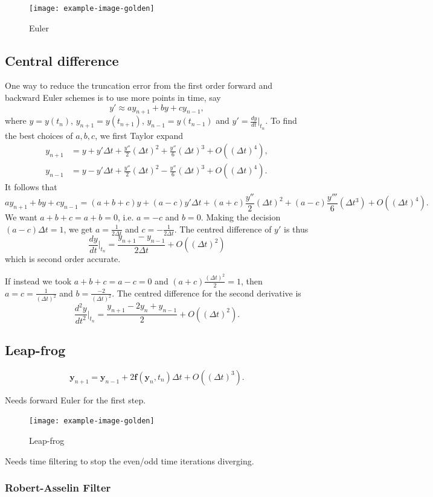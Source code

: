 \documentclass[11pt, a4paper]{article}
\theoremstyle{break}
\newcommand{\ve}{\mathbf} %
\newcommand{\dt}{\Delta t}
\newcommand{\dder}[2]{\frac{d #1}{d #2}}
\newcommand{\ddder}[3][2]{\frac{d^#1 #2}{d #3^#1}}
\newcommand{\eval}[1]{\big\rvert_{#1}}
\newcommand{\Eval}[1]{\bigg\rvert_{#1}}
\begin{document}
\begin{figure}\centering
	\texttt{[image: example-image-golden]}
	\caption{Euler}\label{fig:euler}
\end{figure}

\subsection{Central difference}
One way to reduce the truncation error from the first order forward and backward Euler schemes is to use more points in time, say \[y'\approx a	y_{n+1}+by+cy_{n-1},\] where $y=y(t_n)$, $y_{n+1}=y(t_{n+1})$, $y_{n-1}=y(t_{n-1})$ and $y' = \dder yt\eval{t_n}$. To find the best choices of $a,b,c$, we first Taylor expand \begin{align*}
y_{n+1}&=y+y'\dt+\frac{y''}{2}(\dt)^2+\frac{y''}{6}(\dt)^3+O((\dt)^4),\\
y_{n-1}&=y-y'\dt+\frac{y''}{2}(\dt)^2-\frac{y''}{6}(\dt)^3+O((\dt)^4).
\end{align*} It follows that \[ay_{n+1}+by+cy_{n-1}=(a+b+c)y+(a-c)y'\dt+(a+c)\frac{y''}{2}(\dt)^2 +(a-c)\frac{y'''}{6}(\dt^3)+O((\dt)^4).\]
We want $a+b+c=a+b=0$, i.e. $a=-c$ and $b=0$. Making the decision $(a-c)\dt=1$, we get $a=\frac1{2\dt}$ and $c=-\frac1{2\dt}$. The centred difference of $y'$ is thus \[\dder yt\Eval{t_n}=\frac{y_{n+1}-y_{n-1}}{2\dt}+O((\dt)^2)\] which is second order accurate.

If instead we took $a+b+c=a-c=0$ and $(a+c)\frac{(\dt)^2}{2}=1$, then $a=c=\frac1{(\dt)^2}$ and $b=\frac{-2}{(\dt)^2}$. The centred difference for the second derivative is \[\ddder yt\Eval{t_n}=\frac{y_{n+1}-2y_n+y_{n-1}}{2}+O((\dt)^2).\]

\subsection{Leap-frog}

\[\ve y_{n+1}=\ve y_{n-1}+2\ve f(\ve y_n,t_n)\dt+O((\dt)^3).\]

Needs forward Euler for the first step.


\begin{figure}\centering
	\texttt{[image: example-image-golden]}
	\caption{Leap-frog}\label{fig:leapFrog}
\end{figure}

Needs time filtering to stop the even/odd time iterations diverging.

\subsubsection{Robert-Asselin Filter}
\end{document}
